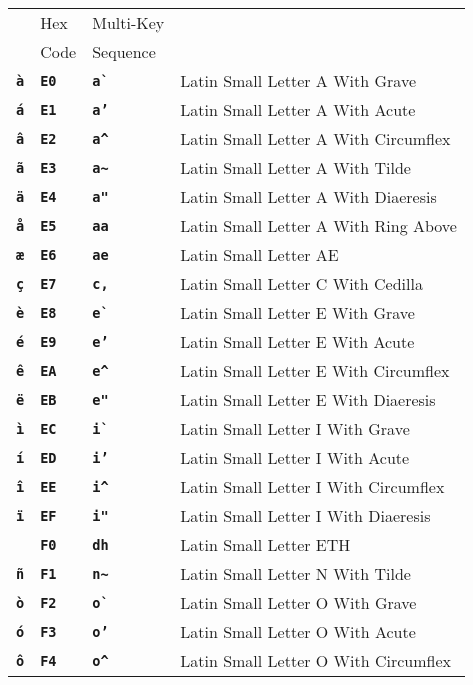 \documentclass[12pt]{article}
\newcommand{\TT}[1]{{\tt \bfseries #1}}
\newlength{\figurewidth}
\newenvironment{boxedfigure}[1][!btp]%
	{\begin{figure*}[#1]
	 \begin{lrbox}{\figurebox}
	 \begin{minipage}{\figurewidth}

	 \vspace*{1ex}}%
	{
	 \vspace*{1ex}

	 \end{minipage}
	 \end{lrbox}

	 \centering
	 \fbox{\hspace*{0.1in}\usebox{\figurebox}\hspace*{0.1in}}
	 \end{figure*}}
\begin{document}
\begin{boxedfigure}
\begin{tabular}{llll}
& Hex & Multi-Key \\
& Code & Sequence
\\[1ex]
\TT{\`a}
  & \TT{E0} & \TT{a\`~} & Latin Small Letter A With Grave \\
\TT{\'a}
  & \TT{E1} & \TT{a'} & Latin Small Letter A With Acute \\
\TT{\^a}
  & \TT{E2} & \TT{a\textasciicircum} & Latin Small Letter A With Circumflex \\
\TT{\~a}
  & \TT{E3} & \TT{a\textasciitilde} & Latin Small Letter A With Tilde \\
\TT{\"a}
  & \TT{E4} & \TT{a"} & Latin Small Letter A With Diaeresis \\
\TT{\aa}
  & \TT{E5} & \TT{aa} & Latin Small Letter A With Ring Above \\
\TT{\ae}
  & \TT{E6} & \TT{ae} & Latin Small Letter AE \\
\TT{\c{c}}
  & \TT{E7} & \TT{c,} & Latin Small Letter C With Cedilla \\
\TT{\`e}
  & \TT{E8} & \TT{e\`~} & Latin Small Letter E With Grave \\
\TT{\'e}
  & \TT{E9} & \TT{e'} & Latin Small Letter E With Acute \\
\TT{\^e}
  & \TT{EA} & \TT{e\textasciicircum} & Latin Small Letter E With Circumflex \\
\TT{\"e}
  & \TT{EB} & \TT{e"} & Latin Small Letter E With Diaeresis \\
\TT{\`{\i}}
  & \TT{EC} & \TT{i\`~} & Latin Small Letter I With Grave \\
\TT{\'{\i}}
  & \TT{ED} & \TT{i'} & Latin Small Letter I With Acute \\
\TT{\^{\i}}
  & \TT{EE} & \TT{i\textasciicircum} & Latin Small Letter I With Circumflex \\
\TT{\"{\i}}
  & \TT{EF} & \TT{i"} & Latin Small Letter I With Diaeresis \\
\TT{\dh}
  & \TT{F0} & \TT{dh} & Latin Small Letter ETH \\
\TT{\~n}
  & \TT{F1} & \TT{n\textasciitilde} & Latin Small Letter N With Tilde \\
\TT{\`o}
  & \TT{F2} & \TT{o\`~} & Latin Small Letter O With Grave \\
\TT{\'o}
  & \TT{F3} & \TT{o'} & Latin Small Letter O With Acute \\
\TT{\^o}
  & \TT{F4} & \TT{o\textasciicircum} & Latin Small Letter O With Circumflex \\

\end{tabular}
\end{boxedfigure}
\end{document}
